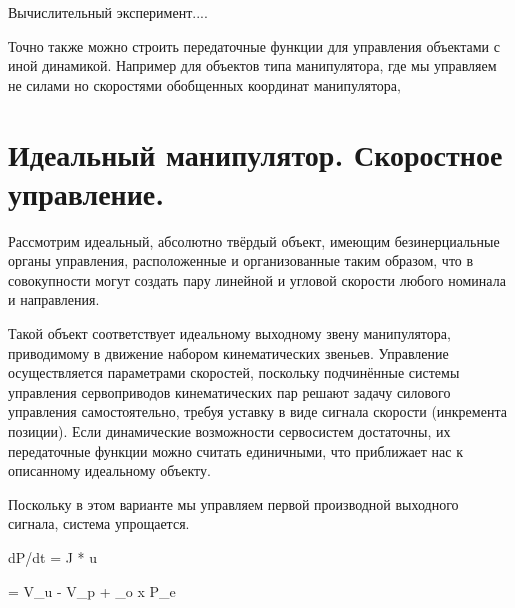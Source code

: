 \documentclass[a4paper]{article}
\begin{document}
Вычислительный эксперимент....

Точно также можно строить передаточные функции для управления объектами с иной динамикой. Например для объектов типа манипулятора, где мы управляем не силами но скоростями обобщенных координат манипулятора,


\section{Идеальный манипулятор. Скоростное управление.}
Рассмотрим идеальный, абсолютно твёрдый объект, имеющим безинерциальные органы управления, расположенные и организованные таким образом, что в совокупности могут создать пару линейной и угловой скорости любого номинала и направления.

Такой объект соответствует идеальному выходному звену манипулятора, приводимому в движение набором кинематических звеньев. Управление осуществляется параметрами скоростей, поскольку подчинённые системы управления сервоприводов кинематических пар решают задачу силового управления самостоятельно, требуя уставку в виде сигнала скорости (инкремента позиции). Если динамические возможности сервосистем достаточны, их передаточные функции можно считать единичными, что приближает нас к описанному идеальному объекту.

Поскольку в этом варианте мы управляем первой производной выходного сигнала, система упрощается.

dP/dt = J * u

 = V_u - V_p + \omega_o x P_e
\end{document}
